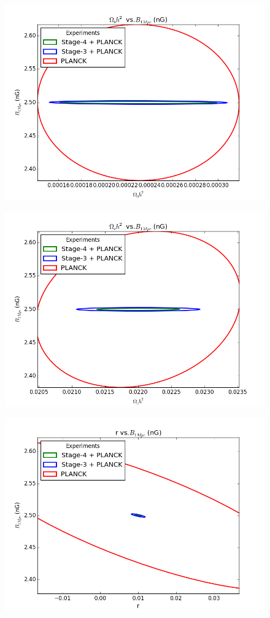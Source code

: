 \begin{figure}[h]
\centering
\includegraphics[scale=0.8]{images/contours/ombh.png}
\caption{}
\label{fig:ombh}
\end{figure}

\begin{figure}[h]
\centering
\includegraphics[scale=0.8]{images/contours/omch.png}
\caption{}
\label{fig:omch}
\end{figure}

\begin{figure}[h]
\centering
\includegraphics[scale=0.8]{images/contours/r.png}
\caption{}
\label{fig:r}
\end{figure}